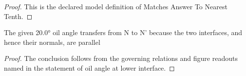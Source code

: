 \begin{proof}
  This is the declared model definition of Matches Answer To Nearest Tenth.
\end{proof}
\begin{lemma}
  \label{lem:physics:phyx-mini-0000:phyxminiproblems-problemphyxmini0000-oil-angle-at-lower-interface}
  The given 20.0° oil angle transfers from N to N' because the two interfaces, and hence their normals, are parallel
\end{lemma}
\begin{proof}
  The conclusion follows from the governing relations and figure readouts named in the statement of oil angle at lower interface.
\end{proof}
